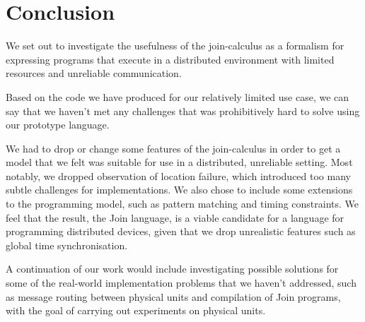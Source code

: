 \section{Conclusion}
We set out to investigate the usefulness of the join-calculus as a
formalism for expressing programs that execute in a distributed environment with
limited resources and unreliable communication.

Based on the code we have produced for our relatively limited use case, we can
say that we haven't met any challenges that was prohibitively hard to solve
using our prototype language.

We had to drop or change some features of the join-calculus in order to get a
model that we felt was suitable for use in a distributed, unreliable setting.
Most notably, we dropped observation of location failure, which introduced too
many subtle challenges for implementations. We also chose to include some
extensions to the programming model, such as pattern matching and timing
constraints. We feel that the result, the Join language, is a viable candidate
for a language for programming distributed devices, given that we drop
unrealistic features such as global time synchronisation.

A continuation of our work would include investigating possible solutions for
some of the real-world implementation problems that we haven't addressed, such
as message routing between physical units and compilation of Join programs, with
the goal of carrying out experiments on physical units.
